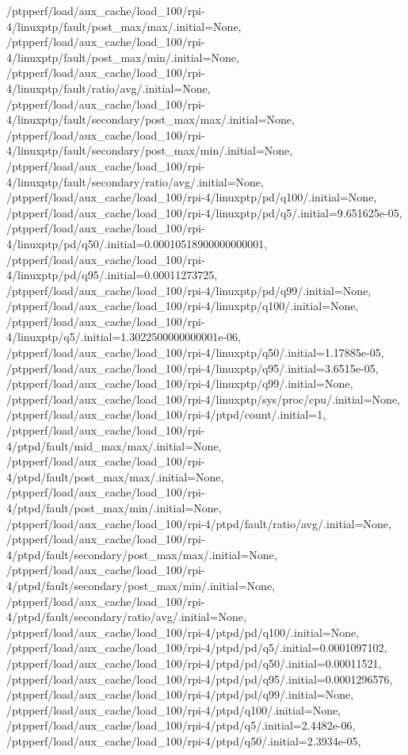 {    /ptpperf/load/aux_cache/load_100/rpi-4/linuxptp/fault/post_max/max/.initial=None,
    /ptpperf/load/aux_cache/load_100/rpi-4/linuxptp/fault/post_max/min/.initial=None,
    /ptpperf/load/aux_cache/load_100/rpi-4/linuxptp/fault/ratio/avg/.initial=None,
    /ptpperf/load/aux_cache/load_100/rpi-4/linuxptp/fault/secondary/post_max/max/.initial=None,
    /ptpperf/load/aux_cache/load_100/rpi-4/linuxptp/fault/secondary/post_max/min/.initial=None,
    /ptpperf/load/aux_cache/load_100/rpi-4/linuxptp/fault/secondary/ratio/avg/.initial=None,
    /ptpperf/load/aux_cache/load_100/rpi-4/linuxptp/pd/q100/.initial=None,
    /ptpperf/load/aux_cache/load_100/rpi-4/linuxptp/pd/q5/.initial=9.651625e-05,
    /ptpperf/load/aux_cache/load_100/rpi-4/linuxptp/pd/q50/.initial=0.00010518900000000001,
    /ptpperf/load/aux_cache/load_100/rpi-4/linuxptp/pd/q95/.initial=0.00011273725,
    /ptpperf/load/aux_cache/load_100/rpi-4/linuxptp/pd/q99/.initial=None,
    /ptpperf/load/aux_cache/load_100/rpi-4/linuxptp/q100/.initial=None,
    /ptpperf/load/aux_cache/load_100/rpi-4/linuxptp/q5/.initial=1.3022500000000001e-06,
    /ptpperf/load/aux_cache/load_100/rpi-4/linuxptp/q50/.initial=1.17885e-05,
    /ptpperf/load/aux_cache/load_100/rpi-4/linuxptp/q95/.initial=3.6515e-05,
    /ptpperf/load/aux_cache/load_100/rpi-4/linuxptp/q99/.initial=None,
    /ptpperf/load/aux_cache/load_100/rpi-4/linuxptp/sys/proc/cpu/.initial=None,
    /ptpperf/load/aux_cache/load_100/rpi-4/ptpd/count/.initial=1,
    /ptpperf/load/aux_cache/load_100/rpi-4/ptpd/fault/mid_max/max/.initial=None,
    /ptpperf/load/aux_cache/load_100/rpi-4/ptpd/fault/post_max/max/.initial=None,
    /ptpperf/load/aux_cache/load_100/rpi-4/ptpd/fault/post_max/min/.initial=None,
    /ptpperf/load/aux_cache/load_100/rpi-4/ptpd/fault/ratio/avg/.initial=None,
    /ptpperf/load/aux_cache/load_100/rpi-4/ptpd/fault/secondary/post_max/max/.initial=None,
    /ptpperf/load/aux_cache/load_100/rpi-4/ptpd/fault/secondary/post_max/min/.initial=None,
    /ptpperf/load/aux_cache/load_100/rpi-4/ptpd/fault/secondary/ratio/avg/.initial=None,
    /ptpperf/load/aux_cache/load_100/rpi-4/ptpd/pd/q100/.initial=None,
    /ptpperf/load/aux_cache/load_100/rpi-4/ptpd/pd/q5/.initial=0.0001097102,
    /ptpperf/load/aux_cache/load_100/rpi-4/ptpd/pd/q50/.initial=0.00011521,
    /ptpperf/load/aux_cache/load_100/rpi-4/ptpd/pd/q95/.initial=0.0001296576,
    /ptpperf/load/aux_cache/load_100/rpi-4/ptpd/pd/q99/.initial=None,
    /ptpperf/load/aux_cache/load_100/rpi-4/ptpd/q100/.initial=None,
    /ptpperf/load/aux_cache/load_100/rpi-4/ptpd/q5/.initial=2.4482e-06,
    /ptpperf/load/aux_cache/load_100/rpi-4/ptpd/q50/.initial=2.3934e-05,
}
